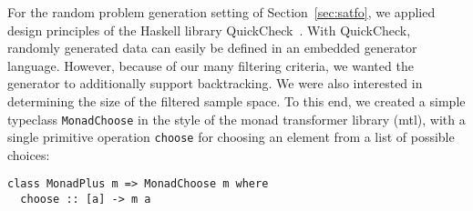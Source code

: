 %
%
%


For the random problem generation setting of Section~\ref{sec:satfo},
we applied design principles of the Haskell library
QuickCheck~\cite{ClaessenHughes:2000:QuickCheck}.
With QuickCheck, randomly generated data can easily be defined in an embedded generator language.
However, because of our many filtering criteria, we wanted the generator to additionally support backtracking.
We were also interested in determining the size of the filtered sample space.
To this end,
we created a simple typeclass \texttt{MonadChoose} in the style of the monad transformer library (mtl),
with a single primitive operation \texttt{choose} for choosing an element from a list of possible choices:
\begin{lstlisting}
class MonadPlus m => MonadChoose m where
  choose :: [a] -> m a
\end{lstlisting}

